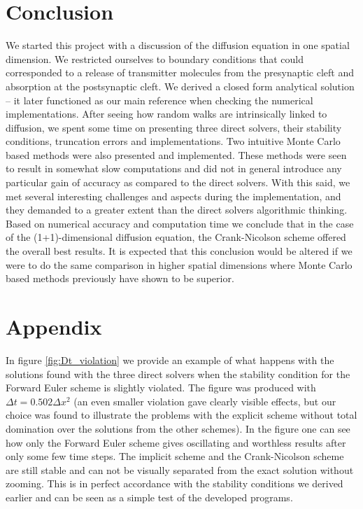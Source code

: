 \documentclass[a4paper, 11pt, notitlepage,english]{article}
\begin{document}
\section{Conclusion}
We started this project with a discussion of the diffusion equation in one spatial dimension. We restricted ourselves to boundary conditions that could corresponded to a 
release of transmitter molecules from the presynaptic cleft and absorption at the postsynaptic cleft. We derived a closed form analytical solution – it later functioned as 
our main reference when checking the numerical implementations. After seeing how random walks are intrinsically linked to diffusion, we spent some time on presenting three 
direct solvers, their stability conditions, truncation errors and implementations. Two intuitive Monte Carlo based methods were also presented and implemented. These methods
were seen to result in somewhat slow computations and did not in general introduce any particular gain of accuracy as compared to the direct solvers. With this said, we met 
several interesting challenges and aspects during the implementation, and they demanded to a greater extent than the direct solvers algorithmic thinking. \\

Based on numerical accuracy and computation time we conclude that in the case of the (1+1)-dimensional diffusion equation, the Crank-Nicolson scheme offered the overall best results. It is expected that this conclusion would be altered if we were to do the same comparison in higher spatial dimensions where Monte Carlo based methods previously have shown to be superior.

\section{Appendix}
In figure \ref{fig:Dt_violation} we provide an example of what happens with the solutions found with the three direct solvers when the stability condition for the Forward Euler scheme is slightly violated. The figure was produced with $\Delta t = 0.502 \Delta x^2$ (an even smaller violation gave clearly visible effects, but our choice was found to illustrate the problems with the explicit scheme without total domination over the solutions from the other schemes). In the figure one can see how only the Forward Euler scheme gives oscillating and worthless results after only some few time steps. The implicit scheme and the Crank-Nicolson scheme are still stable and can not be visually separated from the exact solution without zooming. This is in perfect accordance with the stability conditions we derived earlier and can be seen as a simple test of the developed programs.
\end{document}

